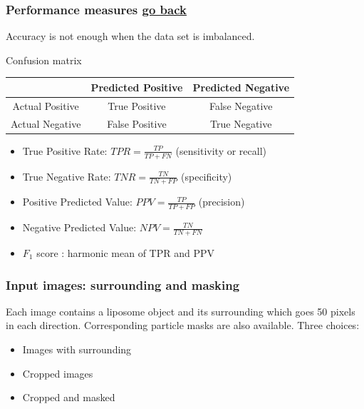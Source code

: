 \documentclass{beamer}
\begin{document}
\begin{frame}[label=perf_measures]
\frametitle{Performance measures \hyperlink{best_lipnet<1>}{\underline{go back}}}

\begin{block}{}
Accuracy is not enough when the data set is imbalanced.
\end{block}

\begin{block}{Confusion matrix}
\begin{table}
\begin{tabular}{|c|c|c|}
\hline 
 & Predicted Positive & Predicted Negative \\ 
\hline 
Actual Positive & True Positive & False Negative \\ 
\hline 
Actual Negative & False Positive & True Negative \\ 
\hline 
\end{tabular} 
\end{table}
\end{block}

\begin{itemize}
\item True Positive Rate: $TPR = \frac{TP}{TP + FN}$ (sensitivity or recall)
\item True Negative Rate: $TNR = \frac{TN}{TN + FP}$ (specificity)
\item Positive Predicted Value: $PPV = \frac{TP}{TP + FP}$ (precision)
\item Negative Predicted Value: $NPV = \frac{TN}{TN + FN}$
\item $F_1$ score : harmonic mean of TPR and PPV
\end{itemize}
\end{frame}

%
%

\begin{frame}
\frametitle{Input images: surrounding and masking}
Each image contains a liposome object and its surrounding which goes 50 pixels in each direction. Corresponding particle masks are also available. 
\vskip 0.2in
Three choices:
\begin{itemize}
\item Images with surrounding
\item Cropped images
\item \alert<2>{Cropped and masked} 
\end{itemize}
\end{frame}
\end{document}
